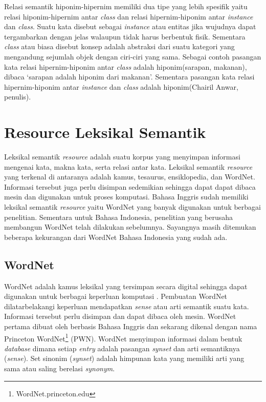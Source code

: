 Relasi semantik hiponim-hipernim memiliki dua tipe yang lebih spesifik yaitu relasi hiponim-hipernim antar \textit{class} dan relasi hipernim-hiponim antar \textit{instance} dan \textit{class}. Suatu kata disebut sebagai \textit{instance} atau entitas jika wujudnya dapat tergambarkan dengan jelas walaupun tidak harus berbentuk fisik. Sementara \textit{class} atau biasa disebut konsep adalah abstraksi dari suatu kategori yang mengandung sejumlah objek dengan ciri-ciri yang sama. Sebagai contoh pasangan kata relasi hipernim-hiponim antar \textit{class} adalah hiponim(sarapan, makanan), dibaca `sarapan adalah hiponim dari makanan'. Sementara pasangan kata relasi hipernim-hiponim antar \textit{instance} dan \textit{class} adalah hiponim(Chairil Anwar, penulis).


\section{Resource Leksikal Semantik}
Leksikal semantik \textit{resource} adalah suatu korpus yang menyimpan informasi mengenai kata, makna kata, serta relasi antar kata. Leksikal semantik \textit{resource} yang terkenal di antaranya adalah kamus, tesaurus, ensiklopedia, dan WordNet. Informasi tersebut juga perlu disimpan sedemikian sehingga dapat dapat dibaca mesin dan digunakan untuk proses komputasi. Bahasa Inggris sudah memiliki leksikal semantik \textit{resource} yaitu WordNet yang banyak digunakan untuk berbagai penelitian. Sementara untuk Bahasa Indonesia, penelitian yang berusaha membangun WordNet telah dilakukan sebelumnya. Sayangnya masih ditemukan beberapa kekurangan dari WordNet Bahasa Indonesia yang sudah ada. 

\subsection{WordNet}
WordNet adalah kamus leksikal yang tersimpan secara digital sehingga dapat digunakan untuk berbagai keperluan komputasi \citep{miller1995wordnet}. Pembuatan WordNet dilatarbelakangi keperluan mendapatkan \textit{sense} atau arti semantik suatu kata. Informasi tersebut perlu disimpan dan dapat dibaca oleh mesin. WordNet pertama dibuat oleh \cite{miller1995wordnet} berbasis Bahasa Inggris dan sekarang dikenal dengan nama Princeton WordNet\footnote{WordNet.princeton.edu} (PWN). WordNet menyimpan informasi dalam bentuk \textit{database} dimana setiap \textit{entry} adalah pasangan \textit{synset} dan arti semantiknya (\textit{sense}). Set sinonim (\textit{synset}) adalah himpunan kata yang memiliki arti yang sama atau saling berelasi \textit{synonym}. 


